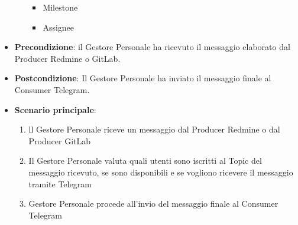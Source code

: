 \begin{itemize}
\begin{itemize}
\begin{itemize}
				\item Milestone
				\item Assignee
			\end{itemize}
		\end{itemize}
		\item \textbf{Precondizione}: il Gestore Personale ha ricevuto il messaggio elaborato dal Producer Redmine o GitLab.
		\item \textbf{Postcondizione}: Il Gestore Personale ha inviato il messaggio finale al Consumer Telegram.
		\item \textbf{Scenario principale}: 
		\begin{enumerate}
			\item ll Gestore Personale riceve un messaggio dal Producer Redmine o dal Producer GitLab
			\item Il Gestore Personale valuta quali utenti sono iscritti al Topic del messaggio ricevuto, se sono disponibili e se vogliono ricevere il messaggio tramite Telegram
			\item Gestore Personale procede all'invio del messaggio finale al Consumer Telegram
		\end{enumerate}
		
	\end{itemize}